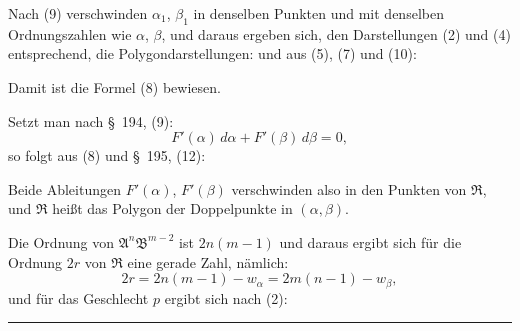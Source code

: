 Nach (9) verschwinden $\alpha_1$, $\beta_1$ in denselben Punkten und mit denselben Ordnungszahlen wie $\alpha$, $\beta$, und daraus ergeben sich, den Darstellungen (2) und (4) entsprechend, die Polygondarstellungen:
und aus (5), (7) und (10):

Damit ist die Formel (8)  bewiesen.

Setzt man nach \S\ 194, (9):
\[
F'(\alpha)\,d\alpha + F'(\beta)\,d\beta = 0,
\]
so folgt aus (8) und \S\ 195, (12):

Beide Ableitungen $F'(\alpha)$, $F'(\beta)$ verschwinden also in den Punkten von $\mathfrak{R}$, und $\mathfrak{R}$ hei\ss{}t das Polygon der Doppelpunkte in $(\alpha,\beta)$.

Die Ordnung von $\mathfrak{A}^n\mathfrak{B}^{m-2}$ ist $2n(m-1)$ und daraus ergibt sich f\"ur die Ordnung $2r$ von $\mathfrak{R}$ eine gerade Zahl, n\"amlich:
\[
2r = 2n(m-1) - w_\alpha = 2m(n-1) - w_\beta,
\]
und f\"ur das Geschlecht $p$ ergibt sich nach (2):

\begin{center}
\rule{4cm}{0.4pt}
\end{center}
